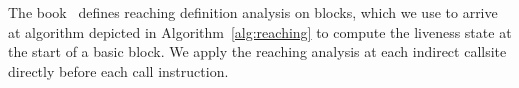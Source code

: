 

%
%
The book~\cite{khedker2009data} defines reaching definition analysis on blocks, which we use to arrive at algorithm depicted in Algorithm~\ref{alg:reaching} to compute 
the liveness state at the start of a basic block. We apply the reaching analysis at each indirect callsite directly before each call instruction.

